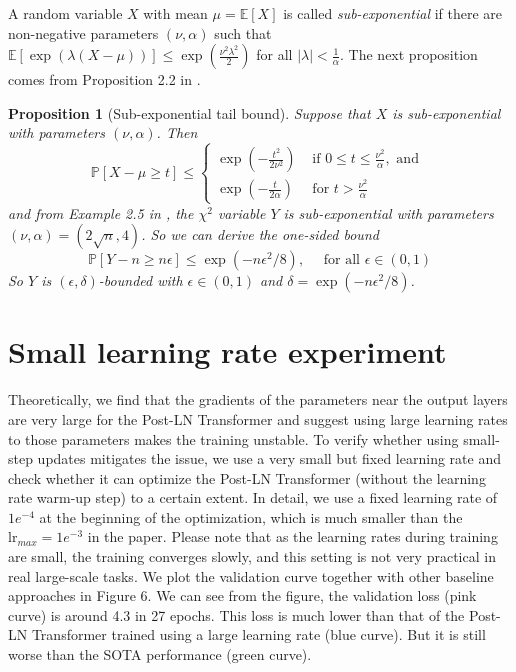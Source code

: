 \documentclass{article}
\newtheorem{proposition}{Proposition}
\begin{document}
A random variable $X$ with mean $\mu=\mathbb{E}[X]$ is called \emph{sub-exponential} if there are non-negative parameters $(\nu,\alpha)$ such that $\mathbb{E}[\exp(\lambda(X-\mu))]\leq \exp(\frac{\nu^2\lambda^2}{2})$ for all $|\lambda|<\frac{1}{\alpha}$. The next proposition comes from Proposition 2.2 in \citep{wainwright2019high}.
\begin{proposition}[Sub-exponential tail bound]
Suppose that $X$ is sub-exponential with parameters $(\nu,\alpha)$. Then 
\begin{equation}
\mathbb{P}[X-\mu \geq t] \leq\left\{\begin{array}{ll}{\exp(-\frac{t^{2}}{2 \nu^{2}})} & {\text { if } 0 \leq t \leq \frac{\nu^{2}}{\alpha}, \text { and }} \\ {\exp(-\frac{t}{2 \alpha})} & {\text { for } t>\frac{\nu^{2}}{\alpha}}\end{array}\right.
\end{equation}
and from Example 2.5 in \citep{wainwright2019high}, the $\chi^2$ variable $Y$ is sub-exponential with parameters $(\nu, \alpha)=(2 \sqrt{n}, 4)$. So we can derive the one-sided bound 
\begin{equation}
    \mathbb{P}\left[Y-n\geq n\epsilon\right] \leq \exp(-n \epsilon^{2} / 8), \quad \text { for all } \epsilon \in(0,1)
\end{equation}
So $Y$ is $(\epsilon,\delta)$-bounded with $\epsilon \in(0,1)$ and $\delta=\exp(-n\epsilon^2/8)$.

\end{proposition}

\section{Small learning rate experiment}

Theoretically, we find that the gradients of the parameters near the output layers are very large for the Post-LN Transformer and suggest using large learning rates to those parameters makes the training unstable. To verify whether using small-step updates mitigates the issue, 
we use a very small but fixed learning rate and check whether it can optimize the Post-LN Transformer (without the learning rate warm-up step) to a certain extent. In detail, we use a fixed learning rate of $1e^{-4}$ at the beginning of the optimization, which is much smaller than the $\text{lr}_{max}= 1e^{-3}$ in the paper. Please note that as the learning rates during training are small, the training converges slowly, and this setting is not very practical in real large-scale tasks. We plot the validation curve together with other baseline approaches in Figure 6. We can see from the figure, the validation loss (pink curve) is around 4.3 in 27 epochs. This loss is much lower than that of the Post-LN Transformer trained using a large learning rate (blue curve). But it is still worse than the SOTA performance (green curve). 
\end{document}

